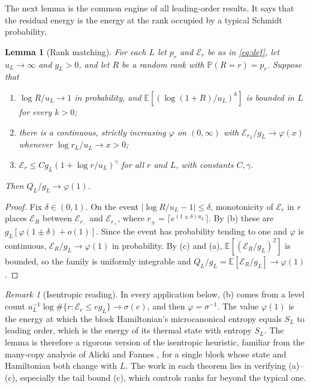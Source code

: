 \documentclass[11pt,a4paper]{article}
\newtheorem{lemma}[theorem]{Lemma}
\theoremstyle{remark}
\newtheorem{remark}[theorem]{Remark}
\newcommand{\E}{\mathbb E}
\newcommand{\Prob}{\mathbb P}
\begin{document}
The next lemma is the common engine of all leading-order results. It says that the residual energy is the energy at the rank occupied by a typical Schmidt probability.

\begin{lemma}[Rank matching]\label{lem:rank}
For each $L$ let $p_r$ and $\mathcal E_r$ be as in \eqref{eq:def}, let $u_L\to\infty$ and $g_L>0$, and let $R$ be a random rank with $\Prob(R=r)=p_r$. Suppose that
\begin{enumerate}[label=(\alph*),itemsep=1pt]
\item $\log R/u_L\to1$ in probability, and $\E[(\log(1+R)/u_L)^k]$ is bounded in $L$ for every $k>0$;
\item there is a continuous, strictly increasing $\varphi$ on $(0,\infty)$ with $\mathcal E_{r_L}/g_L\to\varphi(x)$ whenever $\log r_L/u_L\to x>0$;
\item $\mathcal E_r\le Cg_L(1+\log r/u_L)^{\gamma}$ for all $r$ and $L$, with constants $C,\gamma$.
\end{enumerate}
Then $Q_L/g_L\to\varphi(1)$.
\end{lemma}
\begin{proof}
Fix $\delta\in(0,1)$. On the event $|\log R/u_L-1|\le\delta$, monotonicity of $\mathcal E_r$ in $r$ places $\mathcal E_R$ between $\mathcal E_{r_-}$ and $\mathcal E_{r_+}$, where $r_\pm=\lceil e^{(1\pm\delta)u_L}\rceil$. By (b) these are $g_L[\varphi(1\pm\delta)+o(1)]$. Since the event has probability tending to one and $\varphi$ is continuous, $\mathcal E_R/g_L\to\varphi(1)$ in probability. By (c) and (a), $\E[(\mathcal E_R/g_L)^2]$ is bounded, so the family is uniformly integrable and $Q_L/g_L=\E[\mathcal E_R/g_L]\to\varphi(1)$.
\end{proof}

\begin{remark}[Isentropic reading]\label{rem:isentropic}
In every application below, (b) comes from a level count $u_L^{-1}\log\#\{r:\mathcal E_r\le eg_L\}\to\sigma(e)$, and then $\varphi=\sigma^{-1}$. The value $\varphi(1)$ is the energy at which the block Hamiltonian's microcanonical entropy equals $S_L$ to leading order, which is the energy of its thermal state with entropy $S_L$. The lemma is therefore a rigorous version of the isentropic heuristic, familiar from the many-copy analysis of Alicki and Fannes \cite{alicki}, for a single block whose state and Hamiltonian both change with $L$. The work in each theorem lies in verifying (a)--(c), especially the tail bound (c), which controls ranks far beyond the typical one.
\end{remark}
\end{document}
